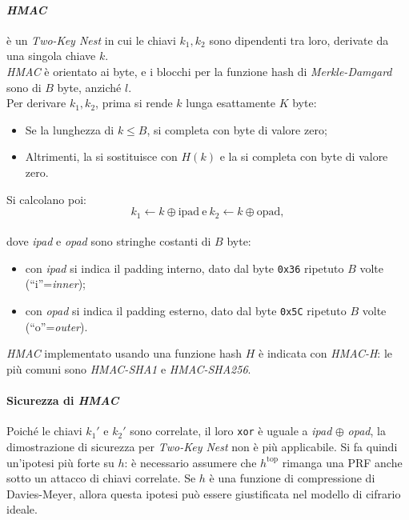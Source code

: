 \paragraph{\emph{HMAC}} è un \emph{Two-Key Nest} in cui le chiavi 
$k_1,k_2$ sono dipendenti tra loro, derivate da una singola chiave $k$. \\ \emph{HMAC} è orientato ai byte, e i blocchi per la funzione hash di \emph{Merkle-Damgard} sono di $B$ byte, anziché $l$. \\ Per derivare $k_1, k_2$, prima si rende $k$ lunga esattamente $K$ byte:
\begin{itemize}
    \item Se la lunghezza di $k \leq B$, si completa con byte di valore zero;
    \item Altrimenti, la si sostituisce con $H(k)$ e la si completa con byte di valore zero.   
\end{itemize}
\noindent Si calcolano poi: 
\[
k_1 \gets k \oplus \text{ipad} \ \text{e} \ k_2 \gets k \oplus \text{opad},
\] \\ dove \textit{ipad} e \textit{opad} sono stringhe costanti di $B$ byte: 
\begin{itemize}
    \item con \textit{ipad} si indica il padding interno, dato dal byte \texttt{0x36} ripetuto $B$ volte (``i''=\textit{inner});
    \item con \textit{opad} si indica il padding esterno, dato dal byte \texttt{0x5C} ripetuto $B$ volte (``o''=\textit{outer}). 
\end{itemize} 

\vspace{0.2cm} \noindent \emph{HMAC} implementato usando una funzione hash $H$ è indicata con \emph{HMAC-H}: le più comuni sono \emph{HMAC-SHA1} e \emph{HMAC-SHA256}. 

\paragraph{Sicurezza di \emph{HMAC}} Poiché le chiavi $k_1'$ e $k_2'$ sono correlate, il loro \texttt{xor} è uguale a \emph{ipad} $\oplus$ \emph{opad}, la dimostrazione di sicurezza per \emph{Two-Key Nest} non è più applicabile. Si fa quindi un'ipotesi più forte su $h$: è necessario assumere che $h^{\text{top}}$ rimanga una PRF anche sotto un attacco di chiavi correlate. Se $h$ è una funzione di compressione di Davies-Meyer, allora questa ipotesi può essere giustificata nel modello di cifrario ideale. 



